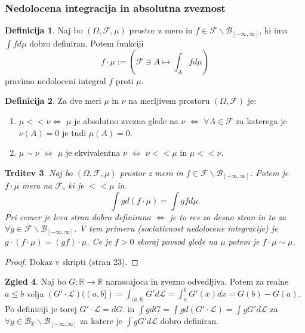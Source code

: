 \documentclass[a4paper,12pt]{article}
\theoremstyle{definition} %
\newtheorem{definicija}{Definicija}[section]
\newtheorem{zgled}[definicija]{Zgled}
\theoremstyle{plain} %
\newtheorem{trditev}[definicija]{Trditev}
\newcommand{\R}{\mathbb{R}}
\newcommand{\F}{\mathcal{F}}
\begin{document}
        \subsubsection{Nedolocena integracija in absolutna zveznost}
            \begin{definicija}
                Naj bo $(\Omega, \F, \mu)$ prostor z mero in $f \in \F\backslash\mathcal{B}_{[-\infty, \infty]}$, 
                ki ima $\int fd\mu$ dobro definiran. Potem funkciji 
                $$
                    f \cdot \mu:= (\F \ni A \mapsto \int_A f d\mu)
                $$
                pravimo nedoloceni integral $f$ proti $\mu$.
            \end{definicija}

            \begin{definicija}
                Za dve meri $\mu$ in $\nu$ na merljivem prostoru $(\Omega, \F)$ je:
                \begin{enumerate}
                    \item $\mu << \nu \iff$ $\mu$ je absolutno zvezna glede na $\nu$ $\iff$ $\forall A \in \F$ za katerega je $\nu(A) = 0$ je tudi $\mu(A) = 0$. 
                    \item $\mu \sim \nu$ $\iff$ $\mu$ je ekvivalentna $\nu$ $\iff$ $\nu << \mu$ in $\mu << \nu.$
                \end{enumerate}
            \end{definicija}

            \begin{trditev}
                Naj bo $(\Omega, \F, \mu)$ prostor z mero in $f \in \F\backslash\mathcal{B}_{[-\infty, \infty]}$. Potem je 
                $f \cdot \mu$ mera na $\F$, ki je $<< \mu$ in 
                $$
                    \int g d(f \cdot \mu) = \int gf d\mu.
                $$
                Pri cemer je leva stran dobro definirana $\iff$ je to res za desno stran in to za $\forall g \in \F\backslash\mathcal{B}_{[-\infty, \infty]}$. V tem primeru (sociativnost nedolocene integracije) je $g \cdot (f \cdot \mu) = (gf)\cdot \mu$. Ce je $f>0$ skoraj povsod glede na $\mu$ potem je $f\cdot\mu \sim \mu$.
            \end{trditev}
            
            \begin{proof}
                Dokaz v skripti (stran 23).
            \end{proof}


            \begin{zgled}
                Naj bo $G: \R\rightarrow\R$ narascajoca in zvezno odvedljiva. Potem za realne $a \leq b$ velja $(G'\cdot\mathcal{L})((a, b]) = \int_{(a, b]}G'd\mathcal{L} = \int_a^b G'(x)dx = G(b) - G(a)$. Po definiciji je torej $G'\cdot\mathcal{L} = dG.$ in $\int gdG = \int gd(G'\cdot\mathcal{L}) = \int gG'd\mathcal{L}$ za $\forall g \in \mathcal{B}_\R\backslash\mathcal{B}_{[-\infty, \infty]}$ za katere je $\int gG'd\mathcal{L}$ dobro definiran.
            \end{zgled}
\end{document}
